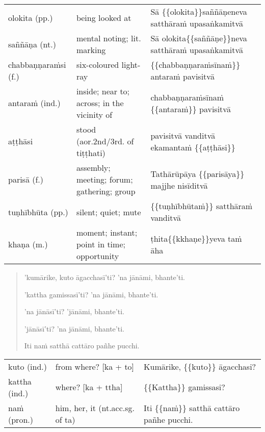 \documentclass[11pt,oneside]{memoir}
\begin{document}
\begin{longtable}{L{\colOne} L{\colTwo} H}
olokita (pp.) & being looked at & Sā \{\{olokita\}\}saññāṇeneva satthāraṁ upasaṅkamitvā\\[0pt]
saññāṇa (nt.) & mental noting; lit. marking & Sā olokita\{\{saññāṇe\}\}neva satthāraṁ upasaṅkamitvā\\[0pt]
chabbaṇṇaraṁsi (f.) & six-coloured light-ray & \{\{chabbaṇṇaraṁsīnaṁ\}\} antaraṁ pavisitvā\\[0pt]
antaraṁ (ind.) & inside; near to; across; in the vicinity of & chabbaṇṇaraṁsīnaṁ \{\{antaraṁ\}\} pavisitvā\\[0pt]
aṭṭhāsi & stood (aor.2nd/3rd. of tiṭṭhati) & pavisitvā vanditvā ekamantaṁ \{\{aṭṭhāsi\}\}\\[0pt]
parisā (f.) & assembly; meeting; forum; gathering; group & Tathārūpāya \{\{parisāya\}\} majjhe nisīditvā\\[0pt]
tuṇhībhūta (pp.) & silent; quiet; mute & \{\{tuṇhībhūtaṁ\}\} satthāraṁ vanditvā\\[0pt]
khaṇa (m.) & moment; instant; point in time; opportunity & ṭhita\{\{kkhaṇe\}\}yeva taṁ āha\\[0pt]
\end{longtable}

\enlargethispage{\baselineskip}

\clearpage

\begin{quote}
'kumārike, kuto āgacchasī'ti? 'na jānāmi, bhante'ti.

'kattha gamissasī'ti? 'na jānāmi, bhante'ti.

'na jānāsī'ti? 'jānāmi, bhante'ti.

'jānāsī'ti? 'na jānāmi, bhante'ti.

Iti naṁ satthā cattāro pañhe pucchi.
\end{quote}

\begin{longtable}{L{\colOne} L{\colTwo} H}
kuto (ind.) & from where? [ka + to] & Kumārike, \{\{kuto\}\} āgacchasi?\\[0pt]
kattha (ind.) & where? [ka + ttha] & \{\{Kattha\}\} gamissasi?\\[0pt]
naṁ (pron.) & him, her, it (nt.acc.sg. of ta) & Iti \{\{naṁ\}\} satthā cattāro pañhe pucchi.\\[0pt]
\end{longtable}

\end{document}
